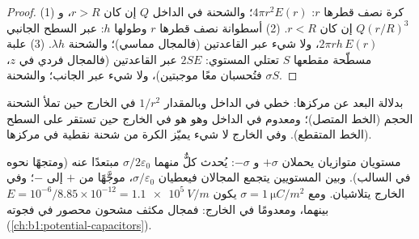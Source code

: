 \begin{proof}
(1) كرة نصف قطرها $r$:  $4\pi r^2E(r)$؛ والشحنة في الداخل $Q$ إن كان
$r > R$، و $Q(r/R)^3$ إن كان $r < R$. (2) أسطوانة نصف قطرها $r$ وطولها $h$:
 عبر السطح الجانبي $2\pi rh\,E(r)$، ولا شيء عبر القاعدتين
(فالمجال مماسي)؛ والشحنة $\lambda h$. (3) علبة مسطّحة مقطعها $S$
تعتلي المستوي:  $2SE$ عبر القاعدتين (فالمجال فردي
في $z$، فتُحسبان معًا موجبتين)، ولا شيء عبر الجانب؛ والشحنة
$\sigma S$.
\end{proof}

\begin{omfigure}

{\small {} بدلالة البعد عن مركزها:
خطي في الداخل وبالمقدار $1/r^2$ في الخارج حين تملأ الشحنة الحجم
(الخط المتصل)؛ ومعدوم في الداخل وهو هو في الخارج حين تستقر على السطح
(الخط المتقطع). وفي الخارج لا شيء يميّز الكرة من شحنة نقطية
في مركزها.}
\end{omfigure}

\begin{example}\label{ex:b1:electrostatics-gauss:twoplanes}
مستويان متوازيان يحملان $+\sigma$ و $-\sigma$: يُحدث كلٌّ منهما
$\sigma/2\varepsilon_0$ مبتعدًا عنه (ومتجهًا نحوه في السالب).
وبين المستويين يتجمع المجالان فيعطيان $\sigma/\varepsilon_0$، موجَّهًا من
$+$ إلى $-$؛ وفي الخارج يتلاشيان. ومع $\sigma = \qty{1}{\micro C/m^2}$ يكون $E =
10^{-6}/8.85 \times 10^{-12} = \qty{1.1e5}{V/m}$ بينهما، ومعدومًا في الخارج:
فمجال مكثف مشحون محصور في فجوته
(\cref{ch:b1:potential-capacitors}).
\end{example}

